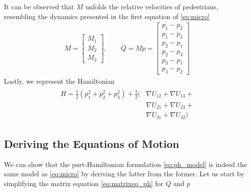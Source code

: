 It can be observed that $M$ unfolds the relative velocities of pedestrians, resembling the dynamics presented in the first equation of \autoref{eq:micro}
\begin{gather*}
    M = 
    \begin{bmatrix}
        M_1 \\ 
        M_2 \\
        M_3
    \end{bmatrix}, \qquad
    \dot Q = Mp = 
    \begin{bmatrix}
        p_1 - p_2 \\
        p_1 - p_3 \\
        p_2 - p_1 \\
        p_2 - p_3 \\
        p_3 - p_1 \\
        p_3 - p_2 
    \end{bmatrix}
\end{gather*}
Lastly, we represent the Hamiltonian
\begin{gather*}
    \begin{aligned}
        H = \frac{1}{2}(p_1^2 + p_2^2 + p_3^2) + \frac{1}{2}(&\nabla U_{12} + \nabla  U_{13} + \\  
        &\nabla  U_{21} +\nabla  U_{23} + \\ 
        &\nabla  U_{31} +\nabla  U_{32})
    \end{aligned}    
\end{gather*}

\hrulefill

\subsection{Deriving the Equations of Motion}
We can show that the port-Hamiltonian formulation \autoref{eq:ph_model} is indeed the same model as \autoref{eq:micro} by deriving the latter from the former. 
Let us start by simplifying the matrix equation \autoref{eq:matrixeq_ph} for $\dot Q$ and $\dot p$

